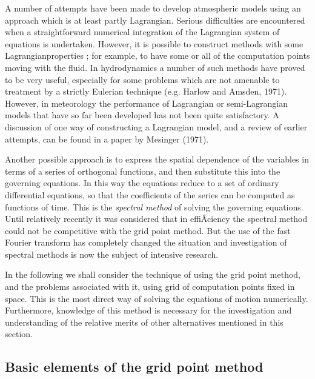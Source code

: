A number of attempts have been made to develop atmospheric models using
an approach which is at least partly Lagrangian. Serious difficulties
are encountered when a straightforward numerical integration of the
Lagrangian system of equations is undertaken. However, it is possible to
construct methods with some Lagrangianproperties ; for example, to have
some or all of the computation points moving with the fluid. In
hydrodynamics a number of such methods have proved to be very useful,
especially for some problems which are not amenable to treatment by a
strictly Eulerian technique (e.g. Harlow and Amsden, 1971). However, in
meteorology the performance of Lagrangian or semi-Lagrangian models
that have so far been developed has not been quite satisfactory. A
discussion of one way of constructing a Lagrangian model, and a review
of earlier attempts, can be found in a paper by Mesinger (1971).

Another possible approach is to express the spatial dependence of the
variables in terms of a series of orthogonal functions, and then
substitute this into the governing equations. In this way the equations
reduce to a set of ordinary differential equations, so that the
coefficients of the series can be computed as functions of time. This is
the \emph{spectral method} of solving the governing equations. Until
relatively recently it was considered that in effiÂciency the spectral
method could not be competitive with the grid point method. But the use
of the fast Fourier transform has completely changed the situation and
investigation of spectral methods is now the subject of intensive
research.

In the following we shall consider the technique of using the grid point
method, and the problems associated with it, using grid of computation
points fixed in space. This is the most direct way of solving the
equations of motion numerically. Furthermore, knowledge of this method
is necessary for the investigation and understanding of the relative
merits of other alternatives mentioned in this section.

\subsection{\texorpdfstring{\textbf{Basic elements of the grid point
method}}{Basic elements of the grid point method}}\label{basic-elements-of-the-grid-point-method}

